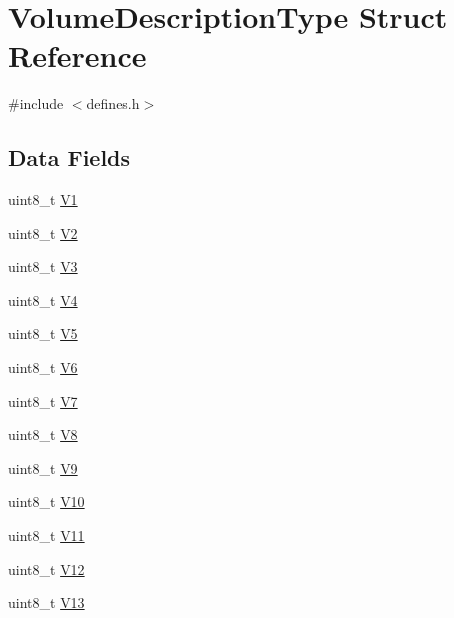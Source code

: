 \hypertarget{structVolumeDescriptionType}{}\section{Volume\+Description\+Type Struct Reference}
\label{structVolumeDescriptionType}


{\ttfamily \#include $<$defines.\+h$>$}

\subsection*{Data Fields}
\begin{DoxyCompactItemize}
\item 
uint8\+\_\+t \hyperlink{structVolumeDescriptionType_a179b7af780dd2a93dcb095d12690f6fa}{V1}
\item 
uint8\+\_\+t \hyperlink{structVolumeDescriptionType_a0c89f2c3b579944fb549107411d97213}{V2}
\item 
uint8\+\_\+t \hyperlink{structVolumeDescriptionType_a2a6a98d42bff4b72a02f562f1be113d2}{V3}
\item 
uint8\+\_\+t \hyperlink{structVolumeDescriptionType_ad10e9650afd43567c2b3b709d72f5dec}{V4}
\item 
uint8\+\_\+t \hyperlink{structVolumeDescriptionType_a986e346428396e0c131a9f200f472716}{V5}
\item 
uint8\+\_\+t \hyperlink{structVolumeDescriptionType_a3f925228651ced5c0e7c373ec6573162}{V6}
\item 
uint8\+\_\+t \hyperlink{structVolumeDescriptionType_a5d057bc3e9f6537234dfb904c740c68f}{V7}
\item 
uint8\+\_\+t \hyperlink{structVolumeDescriptionType_a86597a2edf96558d4176afc6ac3a0565}{V8}
\item 
uint8\+\_\+t \hyperlink{structVolumeDescriptionType_a8db8489c65036975ec2ebe01734310be}{V9}
\item 
uint8\+\_\+t \hyperlink{structVolumeDescriptionType_ac75ed59ba452ed86278e43e6fc5adec1}{V10}
\item 
uint8\+\_\+t \hyperlink{structVolumeDescriptionType_ad9ead8ed6e1eff85d9f1fde20c0ba60d}{V11}
\item 
uint8\+\_\+t \hyperlink{structVolumeDescriptionType_a96c6874117e4b64341e6c207bde061ae}{V12}
\item 
uint8\+\_\+t \hyperlink{structVolumeDescriptionType_ad3a75e21b674eadfa0db9d9df9672e16}{V13}
\end{DoxyCompactItemize}


